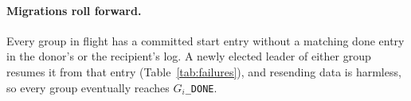 \paragraph{Migrations roll forward.}
Every group in flight has a committed start entry without a matching done entry in the donor's or the recipient's log.
A newly elected leader of either group resumes it from that entry (Table~\ref{tab:failures}), and resending data is harmless, so every group eventually reaches \texttt{$G_i$\_DONE}.
